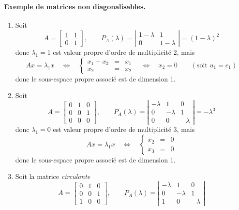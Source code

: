 \paragraph*{Exemple de matrices non diagonalisables.}
\begin{enumerate}
 \item Soit
 $$
 A = \left[\begin{array}{cc} 1 & 1 \\ 0 & 1 \end{array}\right],
 \qquad 
 P_A(\lambda) 
 = \left|\begin{array}{cc} 1-\lambda & 1 \\ 0 & 1-\lambda \end{array}\right|
 = (1 - \lambda)^2
 $$
 donc $\lambda_1 = 1$ est valeur propre d'ordre de multiplicité 2, mais
 $$
 Ax = \lambda_1 x \quad \Leftrightarrow \quad 
 \left\{\begin{array}{rcl} x_1 + x_2 & = & x_1 \\ x_2 & = & x_2 \end{array} \right. \quad \Leftrightarrow \quad 
 x_2 = 0
 \qquad (\text{soit } u_1 = e_1)
 $$
 donc le sous-espace propre associé est de dimension 1.
 \item Soit 
 $$
 A = \left[\begin{array}{rrr} 0 & 1 & 0 \\ 0 & 0 & 1 \\ 0 & 0 & 0 \end{array}\right],
 \qquad 
 P_A(\lambda) 
 = \left|\begin{array}{rrr} -\lambda & 1 & 0 \\ 0 & -\lambda & 1 \\ 0 & 0 & -\lambda \end{array}\right|
 = -\lambda^3
 $$
 donc $\lambda_1 = 0$ est valeur propre d'ordre de multiplicité 3, mais
 $$
 A x = \lambda_1 x \quad \Leftrightarrow \quad 
 \left\{\begin{array}{rcl} x_2 & = & 0 \\ x_3 & = & 0 \end{array} \right.
 $$
 donc le sous-espace propre associé est de dimension 1.
 \item Soit la matrice {\em circulante}
 $$
 A = \left[\begin{array}{rrr} 0 & 1 & 0 \\ 0 & 0 & 1 \\ 1 & 0 & 0 \end{array}\right],
 \qquad 
 P_A(\lambda) 
 = \left|\begin{array}{rrr} -\lambda & 1 & 0 \\ 0 & -\lambda & 1 \\ 1 & 0 & -\lambda \end{array}\right|
$$
\end{enumerate}
